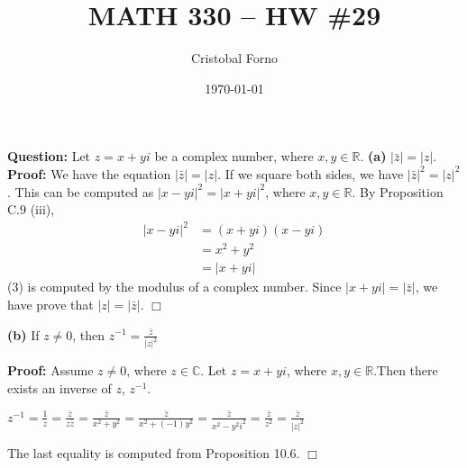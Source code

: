 \documentclass[12pt]{article}
\title{MATH 330 -- HW \#29}
\author{Cristobal Forno}
\date{\today}
\begin{document}
\maketitle

\textbf{Question:} Let $z = x + yi$ be a complex number, where $x, y \in
\mathbb{R}$.
\newline
\textbf{(a)} $|\bar{z}| = |z|$.
\newline
\indent
\textbf{Proof:} We have the equation $|\bar{z}| = |z|$. If we square both sides,
we have $|\bar{z}|^2 = |z|^2$. This can be computed as $|x-yi|^2 = |x+yi|^2$,
where $x, y \in \mathbb{R}$. By Proposition C.9 (iii),
\begin{align}
  |x-yi|^2 &= (x+yi)(x-yi) \\
           &= x^2 + y^2 \\
           &= |x+yi| 
\end{align}
(3) is computed by the modulus of a complex number. Since $|x+yi| = |\bar{z}|$, we have prove
that $|z| = |\bar{z}|$. $\Box$


\noindent
\textbf{(b)} If $z \neq 0$, then $z^{-1} = \frac{\bar{z}}{|z|^2}$

\textbf{Proof:} Assume $z \neq 0$, where $z \in \mathbb{C}$. Let $z = x + yi$,
where $x, y \in \mathbb{R}$.Then there exists
an inverse of $z$, $z^{-1}$.
\begin{center}
$z^{-1} = \frac{1}{z} = \frac{\bar{z}}{z\bar{z}} = \frac{\bar{z}}{x^2+y^2} =
\frac{\bar{z}}{x^2 +(-1)y^2} =  \frac{\bar{z}}{x^2- y^2i^2} =
\frac{\bar{z}}{z^2} = \frac{\bar{z}}{|z|^2}$
\end{center}

The last equality is computed from Proposition 10.6. $\Box$
\end{document}
